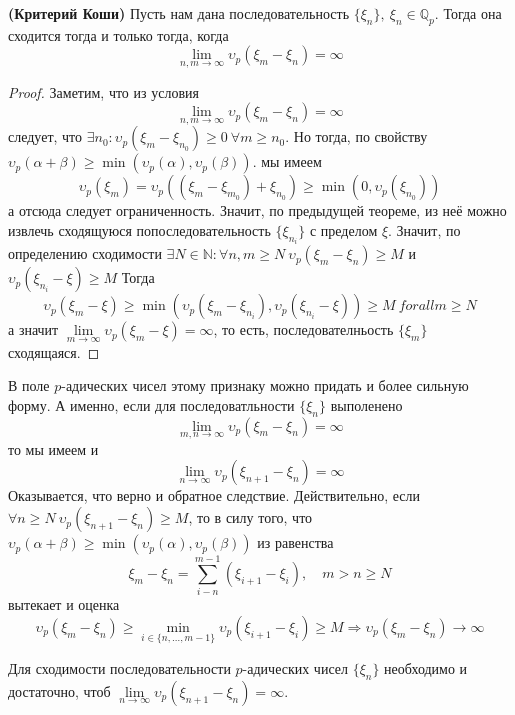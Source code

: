 \documentclass[11pt]{article}
\begin{document}
    \begin{theorem} \textbf{(Критерий Коши)}
        Пусть нам дана последовательность $\{ \xi_n \}, \ \xi_n \in \mathbb{Q}_p$. Тогда она сходится тогда и только тогда, когда
        \[ \lim\limits_{n, m \to \infty} \upsilon_p{(\xi_m - \xi_n)} = \infty \]
    \end{theorem}
    \begin{proof}
        Заметим, что из условия
        \[ \lim\limits_{n, m \to \infty} \upsilon_p{(\xi_m - \xi_n)} = \infty \]
        следует, что $\exists n_0 \colon \upsilon_p{(\xi_m - \xi_{n_0})} \ge 0 \ \forall m \ge n_0$.  Но тогда, по свойству $ \upsilon_p{(\alpha + \beta)} \ge \min(\upsilon_p{(\alpha)}, \upsilon_p{(\beta)})$.
        мы имеем
        \[ \upsilon_p{(\xi_m)} = \upsilon_p{((\xi_m - \xi_{m_0}) + \xi_{n_0})} \ge \min(0, \upsilon_p{(\xi_{n_0})}) \]
        а отсюда следует ограниченность. Значит, по предыдущей теореме, из неё можно извлечь сходящуюся попоследовательность $\{ \xi_{n_i} \}$ с пределом $\xi$.
        Значит, по определению сходимости $\exists N \in \mathbb{N}\colon \forall n, m \ge N \ \upsilon_p{(\xi_m - \xi_n)} \ge M $  и $ \upsilon_p{(\xi_{n_i} - \xi)} \ge M$
        Тогда
        \[ \upsilon_p{(\xi_m - \xi)} \ge \min( \upsilon_p{(\xi_m - \xi_{n_i}), \upsilon_p{(\xi_{n_i} - \xi)}}) \ge M \ forall m \ge N \]
        а значит $\lim\limits_{m \to \infty} \upsilon_p{(\xi_m - \xi)} = \infty$, то есть, последователньость $\{ \xi_m \}$ сходящаяся.
    \end{proof}

    В поле $p$-адических чисел этому признаку можно придать и более сильную форму. А именно, если для последоватльности $\{ \xi_n \}$
    выполенено
    \[ \lim\limits_{m, n \to \infty} \upsilon_p{(\xi_m - \xi_n)} = \infty\]
    то мы имеем и
    \[ \lim\limits_{n \to \infty} \upsilon_p{(\xi_{n + 1} - \xi_n)} = \infty\]
    Оказывается, что верно и обратное следствие. Действительно, если $\forall n \ge N \ \upsilon_p{(\xi_{n + 1} - \xi_n)} \ge M$, то в силу
    того, что $ \upsilon_p{(\alpha + \beta)} \ge \min(\upsilon_p{(\alpha)}, \upsilon_p{(\beta)})$  из равенства
    \[ \xi_m - \xi_n = \sum_{i - n}^{m - 1} (\xi_{i + 1} - \xi_i), \quad m > n \ge N  \]
    вытекает и оценка
    \[ \upsilon_p{(\xi_m - \xi_n)} \ge \min\limits_{i \in \{ n, \ldots, m - 1 \}} \upsilon_p{(\xi_{i + 1} - \xi_{i})} \ge M \Rightarrow \upsilon_p{(\xi_m - \xi_n)} \to \infty \]
    \begin{theorem}\label{p-adic_convergence}
        Для сходимости последовательности $p$-адических чисел $\{ \xi_n \}$ необходимо и достаточно, чтоб $\lim\limits_{n \to \infty} \upsilon_p{(\xi_{n + 1} - \xi_n)} = \infty$.
    \end{theorem}
\end{document}
